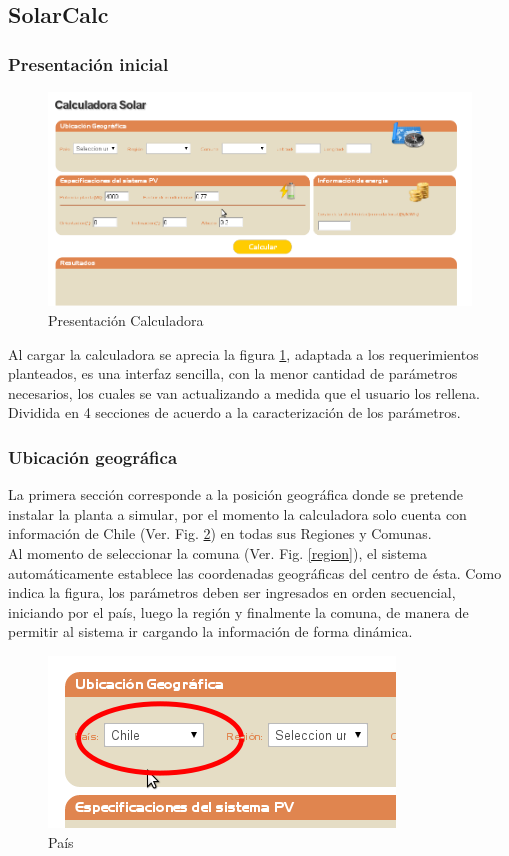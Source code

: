 \newpage 
\subsection{SolarCalc}
\subsubsection{Presentación inicial}
\begin{figure}[ht]
        \centering
        \includegraphics[scale=0.4]{./images/cap5chap1img6}
        \caption{Presentación Calculadora}
        \label{figCalculadora}
\end{figure}

Al cargar la calculadora se aprecia la figura \ref{figCalculadora}, adaptada a los requerimientos planteados, es una interfaz sencilla, con la menor cantidad de parámetros necesarios, los cuales se van actualizando a medida que el usuario los rellena. Dividida en 4 secciones de acuerdo a la caracterización de los parámetros.

\subsubsection{Ubicación geográfica}
La primera sección corresponde a la posición geográfica donde se pretende instalar la planta a simular, por el momento la calculadora solo cuenta con información de Chile (Ver. Fig. \ref{pais}) en todas sus Regiones y Comunas.\\ Al momento de seleccionar la comuna (Ver. Fig. \ref{region}), el sistema automáticamente establece las coordenadas geográficas del centro de ésta. Como indica la figura, los parámetros deben ser ingresados en orden secuencial, iniciando por el país, luego la región y finalmente la comuna, de manera de permitir al sistema ir cargando la información de forma dinámica.
\begin{figure}[ht]
	\centering
	\includegraphics[scale=0.5]{./images/cap5chap1img7-1}
	\caption{País}
	\label{pais}
\end{figure}

